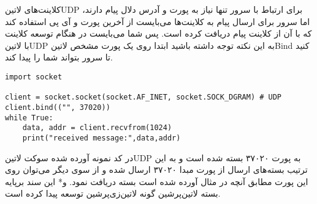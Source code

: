 \documentclass[]{article}
\begin{document}

  کلاینت‌های ‌لاتین{UDP} برای ارتباط با سرور تنها نیاز به پورت و آدرس دلال پیام دارند، اما سرور برای ارسال پیام به کلاینت‌ها
  می‌بایست از آخرین پورت و آی پی استفاده کند که با آن از کلاینت پیام دریافت کرده است. پس شما می‌بایست در هنگام توسعه
  کلاینت با ‌لاتین{UDP} به این نکته توجه داشته باشید ابتدا روی یک پورت مشخص ‌لاتین{Bind}
  کنید تا سرور بتواند شما را پیدا کند.

  \begin{latin}
  \begin{verbatim}
import socket

client = socket.socket(socket.AF_INET, socket.SOCK_DGRAM) # UDP
client.bind(("", 37020))
while True:
    data, addr = client.recvfrom(1024)
    print("received message:",data,addr)
  \end{verbatim}
  \end{latin}

  در کد نمونه آورده شده سوکت ‌لاتین{UDP} به پورت ۳۷۰۲۰ بسته شده است و به این ترتیب بسته‌های ارسال از پورت مبدا ۳۷۰۲۰ ارسال شده
  و از سوی دیگر می‌توان روی این پورت مطابق آنچه در مثال آورده شده است بسته دریافت نمود.
  ‌و*{}
این سند برپایه بسته ‌لاتین{‌پرشین} گونه ‌لاتین{‌زی‌پرشین} توسعه پیدا کرده است.
\end{document}
